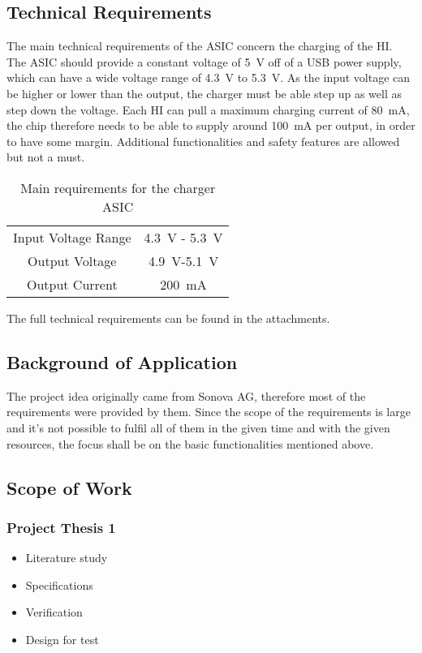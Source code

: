 \subsection{Technical Requirements}
The main technical requirements of the \ac{ASIC} concern the charging of the \ac{HI}. The \ac{ASIC} should provide a constant voltage of \qty{5}{\volt} off of a \ac{USB} power supply, which can have a wide voltage range of \qty{4.3}{\volt} to \qty{5.3}{\volt}. As the input voltage can be higher or lower than the output, the charger must be able step up as well as step down the voltage. \newline Each \ac{HI} can pull a maximum charging current of \qty{80}{\milli\ampere}, the chip therefore needs to be able to supply around \qty{100}{\milli\ampere} per output, in order to have some margin. Additional functionalities and safety features are allowed but not a must.\newline

\begin{table}[H]
	\centering
	\begin{tabular}{|c|c|}
		Input Voltage Range & \qty{4.3}{\volt} - \qty{5.3}{\volt} \\
		Output Voltage & \qty{4.9}{\volt}-\qty{5.1}{\volt} \\
		Output Current & \qty{200}{\milli\ampere}\\
	\end{tabular}
	\caption{Main requirements for the charger \ac{ASIC}}
	\label{tab:RequirementsIC}
\end{table}

The full technical requirements can be found in the attachments.


\subsection{Background of Application}
The project idea originally came from Sonova AG, therefore most of the requirements were provided by them. Since the scope of the requirements is large and it's not possible to fulfil all of them in the given time and with the given resources, the focus shall be on the basic functionalities mentioned above.
\subsection{Scope of Work}
\subsubsection{Project Thesis 1}
\begin{itemize}
	\item Literature study
	\item Specifications
	\item Verification
	\item Design for test
\end{itemize}
